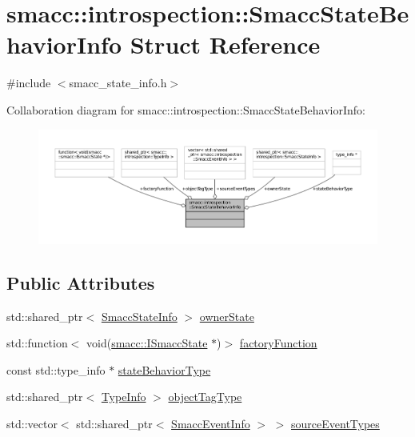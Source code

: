 \hypertarget{structsmacc_1_1introspection_1_1SmaccStateBehaviorInfo}{}\section{smacc\+:\+:introspection\+:\+:Smacc\+State\+Behavior\+Info Struct Reference}
\label{structsmacc_1_1introspection_1_1SmaccStateBehaviorInfo}


{\ttfamily \#include $<$smacc\+\_\+state\+\_\+info.\+h$>$}



Collaboration diagram for smacc\+:\+:introspection\+:\+:Smacc\+State\+Behavior\+Info\+:
\nopagebreak
\begin{figure}[H]
\begin{center}
\leavevmode
\includegraphics[width=350pt]{structsmacc_1_1introspection_1_1SmaccStateBehaviorInfo__coll__graph}
\end{center}
\end{figure}
\subsection*{Public Attributes}
\begin{DoxyCompactItemize}
\item 
std\+::shared\+\_\+ptr$<$ \hyperlink{classsmacc_1_1introspection_1_1SmaccStateInfo}{Smacc\+State\+Info} $>$ \hyperlink{structsmacc_1_1introspection_1_1SmaccStateBehaviorInfo_a3a8978a085abb4e649ac4d3a13bd8257}{owner\+State}
\item 
std\+::function$<$ void(\hyperlink{classsmacc_1_1ISmaccState}{smacc\+::\+I\+Smacc\+State} $\ast$)$>$ \hyperlink{structsmacc_1_1introspection_1_1SmaccStateBehaviorInfo_a966cf5a5fe5cbe839be792b04e6c7368}{factory\+Function}
\item 
const std\+::type\+\_\+info $\ast$ \hyperlink{structsmacc_1_1introspection_1_1SmaccStateBehaviorInfo_a85dc84a01fbd0b830ed6598996c4a7c9}{state\+Behavior\+Type}
\item 
std\+::shared\+\_\+ptr$<$ \hyperlink{classsmacc_1_1introspection_1_1TypeInfo}{Type\+Info} $>$ \hyperlink{structsmacc_1_1introspection_1_1SmaccStateBehaviorInfo_ae853ad3a28609fd83aa3d395d2e4c163}{object\+Tag\+Type}
\item 
std\+::vector$<$ std\+::shared\+\_\+ptr$<$ \hyperlink{structsmacc_1_1introspection_1_1SmaccEventInfo}{Smacc\+Event\+Info} $>$ $>$ \hyperlink{structsmacc_1_1introspection_1_1SmaccStateBehaviorInfo_af4ad563a4b9ed8951ddd33732d466cf4}{source\+Event\+Types}
\end{DoxyCompactItemize}


